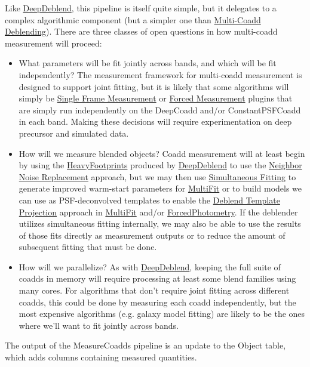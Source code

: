 Like \hyperref[sec:drpDeepDeblend]{DeepDeblend}, this pipeline is itself quite simple, but it delegates to a complex algorithmic component (but a simpler one than \hyperref[sec:acMultiCoaddDeblending]{Multi-Coadd Deblending}).  There are three classes of open questions in how multi-coadd measurement will proceed:
\begin{itemize}
\item What parameters will be fit jointly across bands, and which will be fit independently?  The measurement framework for multi-coadd measurement is designed to support joint fitting, but it is likely that some algorithms will simply be \hyperref[sec:acSingleFrameMeasurement]{Single Frame Measurement} or \hyperref[sec:acForcedMeasurement]{Forced Measurement} plugins that are simply run independently on the DeepCoadd and/or ConstantPSFCoadd in each band.  Making these decisions will require experimentation on deep precursor and simulated data.
\item How will we measure blended objects?  Coadd measurement will at least begin by using the \hyperref[sec:spFootprints]{HeavyFootprints} produced by \hyperref[sec:drpDeepDeblend]{DeepDeblend} to use the \hyperref[sec:acReplaceNeighborsWithNoise]{Neighbor Noise Replacement} approach, but we may then use \hyperref[sec:acSimultaneousFitting]{Simultaneous Fitting} to generate improved warm-start parameters for \hyperref[sec:drpMultiFit]{MultiFit} or to build models we can use as PSF-deconvolved templates to enable the \hyperref[sec:acDeblendTemplateProjection]{Deblend Template Projection} approach in \hyperref[sec:drpMultiFit]{MultiFit} and/or \hyperref[sec:drpForcedPhotometry]{ForcedPhotometry}.  If the deblender utilizes simultaneous fitting internally, we may also be able to use the results of those fits directly as measurement outputs or to reduce the amount of subsequent fitting that must be done.
\item How will we parallelize?  As with \hyperref[sec:drpDeepDeblend]{DeepDeblend}, keeping the full suite of coadds in memory will require processing at least some blend families using many cores.  For algorithms that don't require joint fitting across different coadds, this could be done by measuring each coadd independently, but the most expensive algorithms (e.g. galaxy model fitting) are likely to be the ones where we'll want to fit jointly across bands.
\end{itemize}

The output of the MeasureCoadds pipeline is an update to the Object table, which adds columns containing measured quantities.

